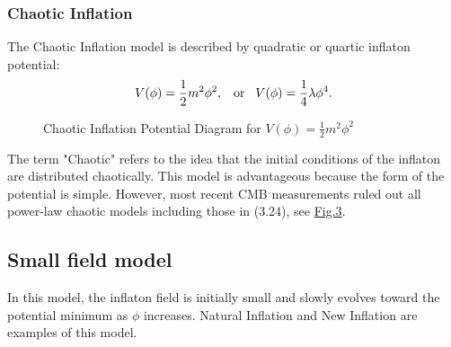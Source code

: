 \documentclass[12pt]{article}
\numberwithin{equation}{section}
\begin{document}
\subsubsection*{Chaotic Inflation}
The Chaotic Inflation model is described by quadratic or quartic inflaton potential:
\begin{equation}
    V(\phi) = \frac{1}{2}m^2 \phi^2,\hspace{0.3cm}\textrm{or}\hspace{0.3cm} V(\phi) = \frac{1}{4}\lambda\phi^4.
\end{equation}
\begin{figure}[H]
    \centering
    \caption{Chaotic Inflation Potential Diagram for $\displaystyle V(\phi) = \frac{1}{2}m^2 \phi^2$}
\end{figure}
\noindent The term "Chaotic" refers to the idea that the initial conditions of the inflaton are distributed chaotically.
This model is advantageous because the form of the potential is simple. However, most recent CMB measurements ruled out all power-law chaotic models including those in (3.24), see \hyperref[fig:Planck]{Fig.3}.

\subsection*{Small field model}
In this model, the inflaton field is initially small and slowly evolves toward the potential minimum as $\phi$ increases. Natural Inflation and New Inflation \cite{Albrecht:1982wi} are examples of this model.
\end{document}
